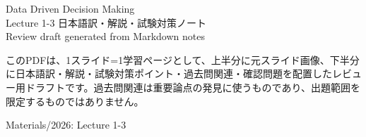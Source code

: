 \documentclass[a4paper,10pt]{article}
\begin{document}
\begin{titlepage}
\centering
\vspace*{2cm}
{\Huge Data Driven Decision Making\\}
\vspace{0.5cm}
{\Large Lecture 1-3 日本語訳・解説・試験対策ノート\\}
\vspace{1cm}
{\large Review draft generated from Markdown notes\\}
\vspace{1cm}
\begin{minipage}{0.85\textwidth}
このPDFは、1スライド=1学習ページとして、上半分に元スライド画像、下半分に日本語訳・解説・試験対策ポイント・過去問関連・確認問題を配置したレビュー用ドラフトです。過去問関連は重要論点の発見に使うものであり、出題範囲を限定するものではありません。
\end{minipage}
\vfill
{\large Materials/2026: Lecture 1-3}
\end{titlepage}
\tableofcontents
\clearpage



\end{document}
